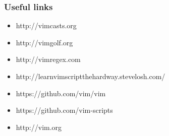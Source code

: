 \documentclass{beamer}
\begin{document}
\begin{frame}
    \frametitle{Useful links}
    \begin{itemize}
        \item http://vimcasts.org
        \item http://vimgolf.org
        \item http://vimregex.com
        \item http://learnvimscriptthehardway.stevelosh.com/
        \item https://github.com/vim/vim
        \item https://github.com/vim-scripts
        \item http://vim.org
    \end{itemize}
\end{frame}
\end{document}
